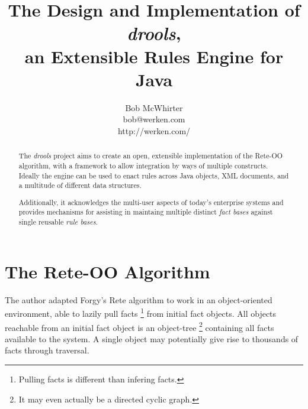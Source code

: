 \documentclass[10pt,twocolumn,letterpaper]{article}
\begin{document}
\let\footnoterule\hrule
\setlength{\skip\footins}{10pt plus 5pt minus 3pt}

\makeatletter

\renewcommand{\@makefntext}[1]%
	{\noindent\makebox[1.8em][r]{\@makefnmark}#1}

\makeatother




\title{The Design and Implementation of \emph{drools},\\an Extensible Rules
Engine for Java}

\author{Bob McWhirter\\bob@werken.com\\http://werken.com/}
\maketitle


\begin{abstract}
The \emph{drools} project aims to create an open, extensible
implementation of the Rete-OO algorithm, with a framework to
allow integration by ways of multiple constructs.  Ideally the 
engine can be used to enact rules across Java objects, XML
documents, and a multitude of different data structures.

Additionally, it acknowledges the multi-user aspects of today's
enterprise systems and provides mechanisms for assisting in
maintaing multiple distinct \emph{fact bases} against single 
reusable \emph{rule bases}.
\end{abstract}

\section{The Rete-OO Algorithm}

The author adapted Forgy's Rete algorithm\cite{forgy82rete} to work in an
object-oriented environment\cite{werken01reteoo}, able to lazily pull facts%
	\footnote{Pulling facts is different than infering facts.} 
from initial fact objects. All objects reachable from an
initial fact object is an object-tree%
	\footnote{It may even actually be a directed cyclic graph.}
containing all facts available to the system.  A single object
may potentially give rise to thousands of facts through traversal.
\end{document}
